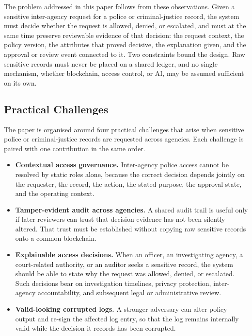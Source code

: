 The problem addressed in this paper follows from these observations. Given a
sensitive inter-agency request for a police or criminal-justice record, the
system must decide whether the request is allowed, denied, or escalated, and
must at the same time preserve reviewable evidence of that decision: the
request context, the policy version, the attributes that proved decisive, the
explanation given, and the approval or review event connected to it. Two
constraints bound the design. Raw sensitive records must never be placed on a
shared ledger, and no single mechanism, whether blockchain, access control, or
AI, may be assumed sufficient on its own.

\subsection{Practical Challenges}

The paper is organised around four practical challenges that arise when
sensitive police or criminal-justice records are requested across agencies.
Each challenge is paired with one contribution in the same order.

\begin{itemize}
    \item \textbf{Contextual access governance.} Inter-agency police access
    cannot be resolved by static roles alone, because the correct decision
    depends jointly on the requester, the record, the action, the stated
    purpose, the approval state, and the operating context.

    \item \textbf{Tamper-evident audit across agencies.} A shared audit trail is
    useful only if later reviewers can trust that decision evidence has not been
    silently altered. That trust must be established without copying raw
    sensitive records onto a common blockchain.

    \item \textbf{Explainable access decisions.} When an officer, an
    investigating agency, a court-related authority, or an auditor seeks a
    sensitive record, the system should be able to state why the request was
    allowed, denied, or escalated. Such decisions bear on investigation
    timelines, privacy protection, inter-agency accountability, and subsequent
    legal or administrative review.

    \item \textbf{Valid-looking corrupted logs.} A stronger adversary can alter
    policy output and re-sign the affected log entry, so that the log remains
    internally valid while the decision it records has been corrupted.
\end{itemize}

